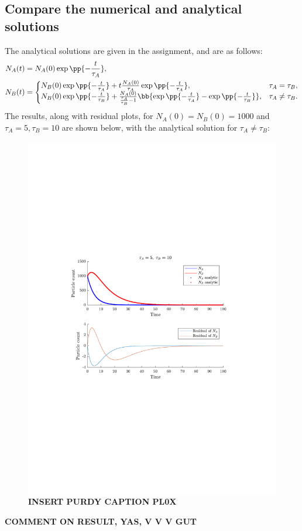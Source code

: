 \documentclass[a4paper,10pt]{article} 	%
\numberwithin{equation}{section}
\begin{document}
	\subsection{Compare the numerical and analytical solutions}
	The analytical solutions are given in the assignment, and are as follows:
	\begin{align}
		N_A(t) &= N_A(0) \exp\pp{-\frac{t}{\tau_A}}, \\
		N_B(t) &= \begin{cases}
		N_B(0) \exp\pp{-\frac{t}{\tau_A}} + t \frac{N_A(0)}{\tau_A} \exp\pp{-\frac{t}{\tau_A}}, & \tau_A= \tau_B, \\
		N_B(0) \exp\pp{-\frac{t}{\tau_B}} + \frac{N_A(0)}{\frac{\tau_A}{\tau_B} - 1} \bb{\exp\pp{-\frac{t}{\tau_A}} - \exp\pp{-\frac{t}{\tau_B}}}, & \tau_A \neq \tau_B.
		\end{cases}
	\end{align}	
	The results, along with residual plots, for $ N_A(0) = N_B(0) = 1000 $ and $ \tau_A = 5, \tau_B = 10 $ are shown below, with the analytical solution for $ \tau_A \neq \tau_B $:
	\begin{figure}[H]
		\centering
		\includegraphics[width=0.7\linewidth]{unequaltau.pdf}
		\caption{\textbf{INSERT PURDY CAPTION PL0X}}
		\label{fig:unequalTau}
	\end{figure}
\textbf{COMMENT ON RESULT, YAS, V V V GUT}
\end{document}
